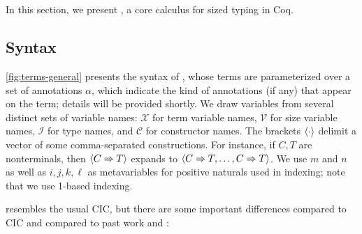 \section{\titlelang}\label{sec:typing}
In this section, we present \lang, a core calculus for sized typing in Coq.

\subsection{Syntax}




\autoref{fig:terms-general} presents the syntax of \lang, whose terms are parameterized over a set of annotations $\alpha$, which indicate the kind of annotations (if any) that appear on the term; details will be provided shortly.
We draw variables from several distinct sets of variable names: $\mathcal{X}$ for term variable names, $\mathcal{V}$ for size variable names, $\mathcal{I}$ for \coinductive type names, and $\mathcal{C}$ for \coinductive constructor names.
The brackets $\langle\cdot\rangle$ delimit a vector of some comma-separated constructions.
For instance, if $C, T$ are nonterminals, then $\langle C \Rightarrow T\rangle$ expands to $\langle C \Rightarrow T, \dots, C \Rightarrow T\rangle$.
We use $m$ and $n$ as well as $i, j, k, \ell$ as metavariables for positive naturals used in indexing; note that we use 1-based indexing.

\lang resembles the usual CIC, but there are some important differences compared to CIC and compared to past work \CIChat and \CIChatminus:

